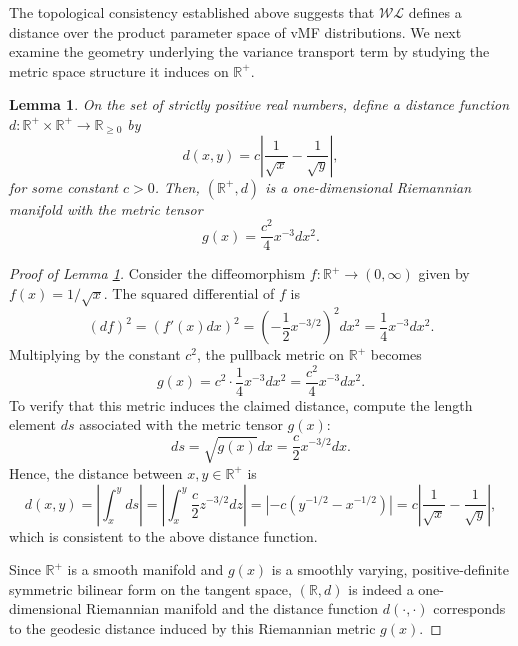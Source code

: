 \documentclass[10pt]{article}
\newtheorem{lemma}[theorem]{Lemma}
\newcommand{\bbR}{\mathbb{R}}
\newcommand{\bbRpos}{\mathbb{R}^+}
\newcommand{\WL}{\mathcal{WL}}
\begin{document}
The topological consistency established above suggests that $\WL$ defines a distance over the product parameter space of vMF distributions. We next examine the geometry underlying the variance transport term by studying the metric space structure it induces on $\bbRpos$.

\begin{lemma}\label{lemma-positive-real}
	On the set of strictly positive real numbers, define a distance function $d:\bbRpos \times \bbRpos \rightarrow \mathbb{R}_{\geq 0}$ by 
	\begin{equation*}
		d(x,y) = c \left\lvert
		\frac{1}{\sqrt{x}} - \frac{1}{\sqrt{y}}
		\right\rvert,
	\end{equation*}
	for some constant $c>0$. Then, $(\bbRpos, d)$ is a one-dimensional Riemannian manifold with the metric tensor
	\begin{equation*}
		g(x) = \frac{c^2}{4}x^{-3} dx^2.
	\end{equation*}
\end{lemma}
\begin{proof}[Proof of Lemma \ref{lemma-positive-real}]
	Consider the diffeomorphism $f:\bbRpos \rightarrow (0,\infty)$ given by $f(x) = 1/\sqrt{x}$. The squared differential of $f$ is 
	\begin{equation*}
		(df)^2 = (f'(x)dx)^2 = \left(-\frac{1}{2}x^{-3/2}\right)^2 dx^2 = \frac{1}{4}x^{-3}dx^2.
	\end{equation*}
	Multiplying by  the constant $c^2$, the pullback metric on $\bbRpos$ becomes
	\begin{equation*}
		g(x) = c^2 \cdot \frac{1}{4} x^{-3} dx^2 = \frac{c^2}{4}x^{-3} dx^2.
	\end{equation*}
	To verify that this metric induces the claimed distance, compute the length element  $ds$ associated with the metric tensor $g(x)$:
	\begin{equation*}
		ds = \sqrt{g(x)} dx = \frac{c}{2} x^{-3/2} dx.
	\end{equation*}
	Hence, the distance between $x,y \in \bbRpos$ is 
	\begin{equation*}
		d(x,y) = \left\lvert \int_x^y ds \right\rvert =  \left\lvert 
		\int_{x}^y \frac{c}{2} z^{-3/2}dz
		\right\rvert = \left\lvert -c  \left(y^{-1/2} - x^{-1/2}\right)\right\rvert = c \left\lvert \frac{1}{\sqrt{x}} - \frac{1}{\sqrt{y}} \right\rvert,
	\end{equation*}
	which is consistent to the above distance function. 
	
	Since $\bbRpos$ is a smooth manifold and $g(x)$ is a smoothly varying, positive-definite symmetric bilinear form on the tangent space, $(\bbR,d)$ is indeed a one-dimensional Riemannian manifold and the distance function $d(\cdot,\cdot)$ corresponds to the geodesic distance induced by this Riemannian metric $g(x)$.
\end{proof}
\end{document}
